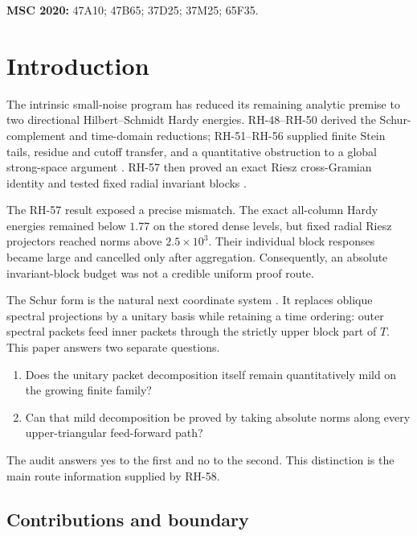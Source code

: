 \documentclass[11pt]{article}
\theoremstyle{remark}
\begin{document}
\medskip
\noindent\textbf{MSC 2020:} 47A10; 47B65; 37D25; 37M25; 65F35.

\section{Introduction}

The intrinsic small-noise program has reduced its remaining analytic premise
to two directional Hilbert--Schmidt Hardy energies.  RH-48--RH-50 derived the
Schur-complement and time-domain reductions; RH-51--RH-56 supplied finite
Stein tails, residue and cutoff transfer, and a quantitative obstruction to a
global strong-space argument \citep{WangIntrinsic2026,WangDirectional2026,
WangHardy2026,WangStructuredStein2026,WangFactorTransfer2026,
WangHardyTail2026,WangFactorAware2026,WangRieszCutoff2026,
WangHardyBarrier2026}.  RH-57 then proved an exact Riesz cross-Gramian identity
and tested fixed radial invariant blocks \citep{WangRieszOverlap2026}.

The RH-57 result exposed a precise mismatch.  The exact all-column Hardy
energies remained below $1.77$ on the stored dense levels, but fixed radial
Riesz projectors reached norms above $2.5\times10^3$.  Their individual block
responses became large and cancelled only after aggregation.  Consequently,
an absolute invariant-block budget was not a credible uniform proof route.

The Schur form is the natural next coordinate system
\citep{GolubVanLoan2013,HornJohnson2013}.  It replaces oblique
spectral projections by a unitary basis while retaining a time ordering:
outer spectral packets feed inner packets through the strictly upper block
part of $T$.  This paper answers two separate questions.

\begin{enumerate}[leftmargin=2.2em]
 \item Does the unitary packet decomposition itself remain quantitatively
       mild on the growing finite family?
 \item Can that mild decomposition be proved by taking absolute norms along
       every upper-triangular feed-forward path?
\end{enumerate}

The audit answers yes to the first and no to the second.  This distinction is
the main route information supplied by RH-58.

\subsection*{Contributions and boundary}
\end{document}
